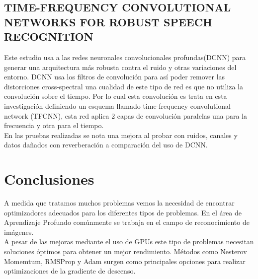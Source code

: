 \subsection{TIME-FREQUENCY CONVOLUTIONAL NETWORKS FOR ROBUST SPEECH RECOGNITION}
Este estudio usa a las redes neuronales convolucionales profundas(DCNN) para generar una arquitectura más robusta contra el ruido y otras variaciones del entorno. DCNN usa los filtros de convolución para así poder remover las distorciones cross-spectral una cualidad de este tipo de red es que no utiliza la convolución sobre el tiempo. Por lo cual esta convolución es trata en esta investigación definiendo un esquema llamado time-frequency convolutional network (TFCNN), esta red aplica 2 capas de convolución paralelas una para la frecuencia y otra para el tiempo.\\ En las pruebas realizadas se nota una mejora al probar con ruidos, canales y datos dañados con reverberación a comparación del uso de DCNN.
\section{Conclusiones}
A medida que tratamos muchos problemas vemos la necesidad de encontrar optimizadores adecuados para los diferentes tipos de problemas. En el área de Aprendizaje Profundo comúnmente se trabaja en el campo de reconocimiento de imágenes.\\ A pesar de las mejoras mediante el uso de GPUs este tipo de problemas necesitan soluciones óptimos para obtener un mejor rendimiento. Métodos como Nesterov Momemtum, RMSProp y Adam surgen como principales opciones para realizar optimizaciones de la gradiente de descenso.

